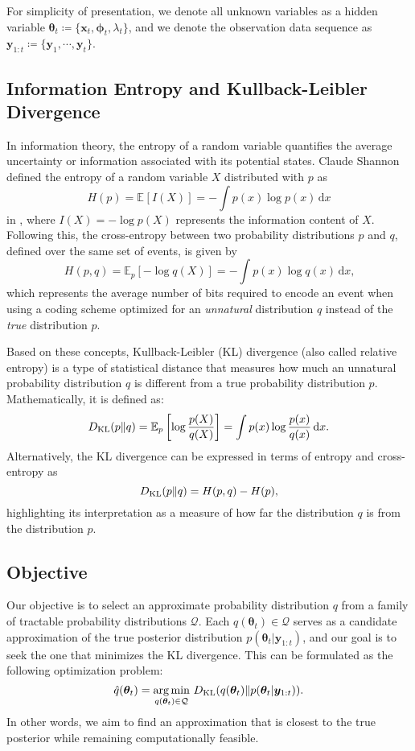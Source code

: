 \documentclass[10pt,twocolumn,twoside]{IEEEtran}
\newtheorem{remark}{Remark}
\newcommand{\argmin}[1]{{\mathop{\arg\min}_{#1}~}}
\newcommand{\E}[2][]{ \mathbb{E}_{#1}\left[#2\right] } %
\newcommand{\cm}{\text{,}} %
\newcommand{\fs}{\text{.}} %
\newcommand{\x}{{ \bm{x} }}
\newcommand{\y}{{ \bm{y} }}
\begin{document}
For simplicity of presentation, we denote all unknown variables as a hidden variable $\bm\theta_t\coloneqq\{\x_t,\bm\phi_t,\lambda_t\}$, and we denote the observation data sequence as $\y_{1:t}\coloneqq\{\y_1,\cdots,\y_t\}$.


\subsection{Information Entropy and Kullback-Leibler Divergence} \label{sec:KLD}
In information theory, the entropy of a random variable quantifies the average uncertainty or information associated with its potential states. Claude Shannon defined the entropy of a random variable $X$ distributed with $p$ as
$$
H(p) = \E{I(X)} = -\int{p(x)\log p(x)}\,\mathrm{d}x
$$
in \cite{shannon1948mathematical}, where $I(X) = -\log{p(X)}$ represents the information content of $X$.
Following this, the cross-entropy between two probability distributions $p$ and $q$, defined over the same set of events, is given by 
$$
H(p, q) = \E[p]{-\log q(X)} = -\int{p(x)\log{q(x)}}\,\mathrm{d}x \cm 
$$  
which represents the average number of bits required to encode an event when using a coding scheme optimized for an {\it unnatural} distribution $q$ instead of the {\it true} distribution $p$.

Based on these concepts, Kullback-Leibler (KL) divergence (also called relative entropy) is a type of statistical distance that measures how much an unnatural probability distribution $q$ is different from a true probability distribution $p$. Mathematically, it is defined as:
$$
D_{\rm KL}(p\Vert q) = \E[p]{\log\frac{p(X)}{q(X)}} = \int{p(x)\log\frac{p(x)}{q(x)}}\,\mathrm{d}x \fs
$$
Alternatively, the KL divergence can be expressed in terms of entropy and cross-entropy as
$$
D_{\rm KL}(p\Vert q) = H(p,q) - H(p) \cm
$$
highlighting its interpretation as a measure of how far the distribution $q$ is from the distribution $p$.



\subsection{Objective}
Our objective is to select an approximate probability distribution $q$ from a family of tractable probability distributions $\mathcal{Q}$. Each $q(\bm\theta_t)\in\mathcal{Q}$ serves as a candidate approximation of the true posterior distribution $p(\bm\theta_t|\y_{1:t})$, and our goal is to seek the one that minimizes the KL divergence. This can be formulated as the following optimization problem:
\begin{equation}
    \hat{q}(\bm\theta_t) = \argmin{q(\bm\theta_t)\in\mathcal{Q}}D_{\rm KL}(q(\bm\theta_t)\Vert p(\bm\theta_t|\y_{1:t})) \fs
\end{equation}
In other words, we aim to find an approximation that is closest to the true posterior while remaining computationally feasible.
\end{document}
